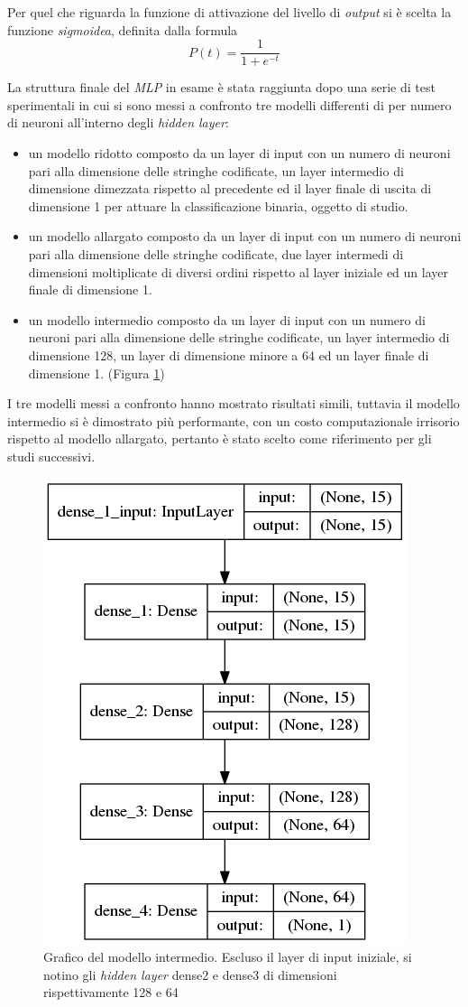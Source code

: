 Per quel che riguarda la funzione di attivazione del livello di \textit{output} si è scelta la funzione \textit{sigmoidea}, definita dalla formula 
$$P(t) = \frac{1}{1+e^{-t}}$$

La struttura finale del \textit{MLP} in esame è stata raggiunta dopo una serie di test sperimentali in cui si sono messi a confronto tre modelli differenti di per numero di neuroni all'interno degli \textit{hidden layer}: 
\begin{itemize}
\item un modello ridotto composto da un layer di input con un numero di neuroni pari alla dimensione delle stringhe codificate, un layer intermedio di dimensione dimezzata rispetto al precedente ed il layer finale di uscita di dimensione 1 per attuare la classificazione binaria, oggetto di studio.

\item un modello allargato composto da un layer di input con un numero di neuroni pari alla dimensione delle stringhe codificate, due layer intermedi di dimensioni moltiplicate di diversi ordini rispetto al layer iniziale ed un layer finale di dimensione 1.

\item un modello intermedio composto da un layer di input con un numero di neuroni pari alla dimensione delle stringhe codificate, un layer intermedio di dimensione 128, un layer di dimensione minore a 64 ed un layer finale di dimensione 1. (Figura \ref{fig:pieraz})

\end{itemize}

I tre modelli messi a confronto hanno mostrato risultati simili, tuttavia  il modello intermedio si è dimostrato più performante, con un costo computazionale irrisorio rispetto al modello allargato, pertanto è stato scelto come riferimento per gli studi successivi.

\begin{figure}[htb]
    \centering
    \includegraphics[width=.4\columnwidth]{figures/pieraz_baseline.png}
    \caption{Grafico del modello intermedio. Escluso il layer di input iniziale, si notino gli \textit{hidden layer} dense2 e dense3 di dimensioni rispettivamente 128 e 64 }
\label{fig:pieraz}
\end{figure}

